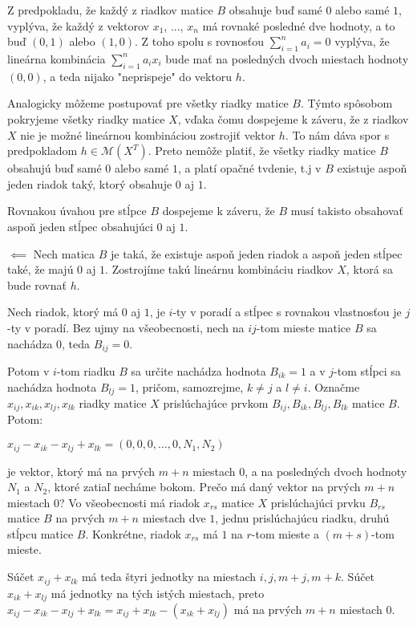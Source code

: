 \begin{dokaz}
Z predpokladu, že každý z riadkov matice $B$ obsahuje buď samé $0$ alebo samé $1$, vyplýva,
že každý z vektorov $x_1$, ..., $x_n$ má rovnaké posledné dve hodnoty, a to buď $(0, 1)$ alebo $(1, 0)$.
Z toho spolu s rovnosťou $\sum_{i = 1}^n a_i = 0$ vyplýva, že lineárna kombinácia $\sum_{i = 1}^n a_i x_i$
bude mať na posledných dvoch miestach hodnoty $(0, 0)$, a teda nijako "neprispeje" do vektoru $h$.

Analogicky môžeme postupovať pre všetky riadky matice $B$.
Týmto spôsobom pokryjeme všetky riadky matice $X$, vďaka čomu dospejeme k záveru,
že z riadkov $X$ nie je možné lineárnou kombináciou zostrojiť vektor $h$.
To nám dáva spor s predpokladom $h \in \mathcal{M}(X^T)$.
Preto nemôže platiť, že všetky riadky matice $B$ obsahujú buď samé $0$ alebo samé $1$,
a platí opačné tvdenie, t.j v $B$ existuje aspoň jeden riadok taký, ktorý obsahuje $0$ aj $1$.

Rovnakou úvahou pre stĺpce $B$ dospejeme k záveru,
že $B$ musí takisto obsahovať aspoň jeden stĺpec obsahujúci $0$ aj $1$.

$\boxed{\impliedby}$ Nech matica $B$ je taká, že existuje aspoň jeden riadok a aspoň jeden stĺpec také, že majú $0$ aj $1$.
Zostrojíme takú lineárnu kombináciu riadkov $X$, ktorá sa bude rovnať $h$.

Nech riadok, ktorý má $0$ aj $1$, je $i$-ty v poradí a stĺpec s rovnakou vlastnosťou je $j$-ty v poradí.
Bez ujmy na všeobecnosti, nech na $ij$-tom mieste matice $B$ sa nachádza $0$, teda $B_{ij} = 0$.

Potom v $i$-tom riadku $B$ sa určite nachádza hodnota $B_{ik} = 1$ a v $j$-tom stĺpci sa nachádza hodnota $B_{lj} = 1$,
pričom, samozrejme, $k \neq j$ a $l \neq i$.
Označme $x_{ij}, x_{ik}, x_{lj}, x_{lk}$ riadky matice $X$ prislúchajúce prvkom $B_{ij}, B_{ik}, B_{lj}, B_{lk}$ matice $B$. Potom:

\begin{center}
$
x_{ij} - x_{ik} - x_{lj} + x_{lk} = (0, 0, 0, \ldots, 0, N_1, N_2)
$
\end{center}
je vektor, ktorý má na prvých $m + n$ miestach $0$, a na posledných dvoch hodnoty $N_1$ a $N_2$, ktoré zatiaľ necháme bokom.
Prečo má daný vektor na prvých $m + n$ miestach $0$?
Vo všeobecnosti má riadok $x_{rs}$ matice $X$ prislúchajúci prvku $B_{rs}$ matice $B$ na prvých $m + n$ miestach dve $1$,
jednu prislúchajúcu riadku, druhú stĺpcu matice $B$. Konkrétne, riadok $x_{rs}$ má $1$ na $r$-tom mieste a $(m + s)$-tom mieste.

Súčet $x_{ij} + x_{lk}$ má teda štyri jednotky na miestach $i, j, m + j, m + k$.
Súčet $x_{ik} + x_{lj}$ má jednotky na tých istých miestach, 
preto $x_{ij} - x_{ik} - x_{lj} + x_{lk} = x_{ij} + x_{lk} - (x_{ik} + x_{lj})$ má na prvých $m + n$ miestach $0$.


\end{dokaz}
